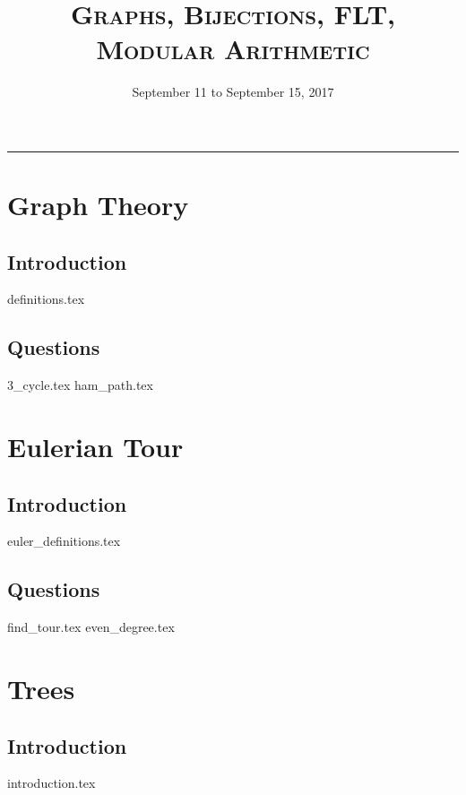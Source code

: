 \documentclass{exam}
\title{\textsc{Graphs, Bijections, FLT, Modular Arithmetic}}
\date{September 11 to September 15, 2017}
\begin{document}
\maketitle
\rule{\textwidth}{0.15em}
\fontsize{12}{15}\selectfont
\thispagestyle{empty}

\section{Graph Theory}
\subsection{Introduction}
\begin{questions}
{definitions.tex}
\end{questions}

\subsection{Questions}
\begin{questions}
{3_cycle.tex}
{ham_path.tex}
\end{questions}

\section{Eulerian Tour}
\subsection{Introduction}
{euler_definitions.tex}
\subsection{Questions}
\begin{questions}
{find_tour.tex}
{even_degree.tex}
\end{questions}
\newpage
\section{Trees}
\subsection{Introduction}
{introduction.tex}
\end{document}
